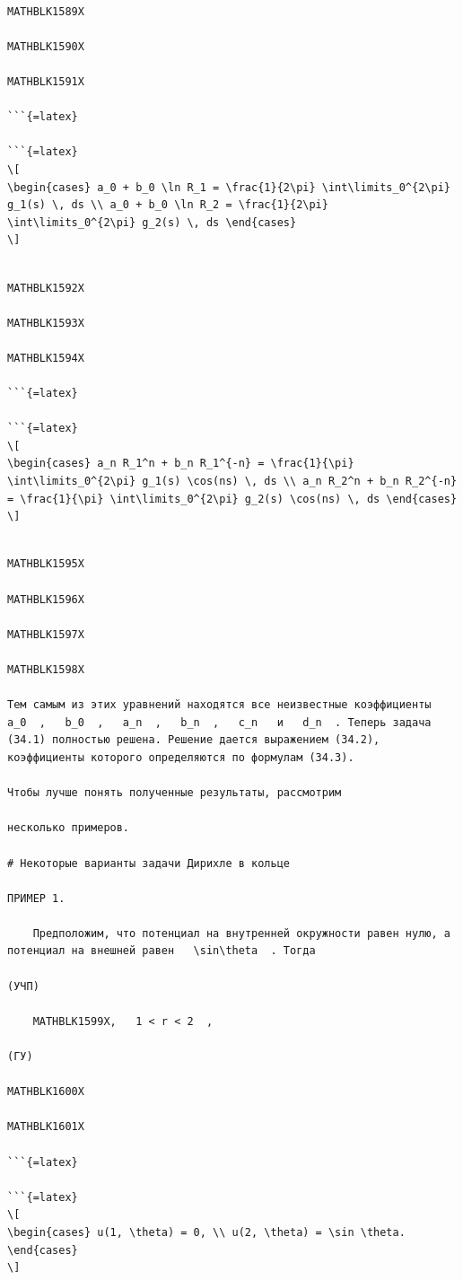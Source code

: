 \documentclass[
]{article}
\begin{document}
\begin{verbatim}

MATHBLK1589X

MATHBLK1590X

MATHBLK1591X

```{=latex}

```{=latex}
\[
\begin{cases} a_0 + b_0 \ln R_1 = \frac{1}{2\pi} \int\limits_0^{2\pi} g_1(s) \, ds \\ a_0 + b_0 \ln R_2 = \frac{1}{2\pi} \int\limits_0^{2\pi} g_2(s) \, ds \end{cases}
\]
\end{verbatim}

\begin{verbatim}

MATHBLK1592X

MATHBLK1593X

MATHBLK1594X

```{=latex}

```{=latex}
\[
\begin{cases} a_n R_1^n + b_n R_1^{-n} = \frac{1}{\pi} \int\limits_0^{2\pi} g_1(s) \cos(ns) \, ds \\ a_n R_2^n + b_n R_2^{-n} = \frac{1}{\pi} \int\limits_0^{2\pi} g_2(s) \cos(ns) \, ds \end{cases}
\]
\end{verbatim}

\begin{verbatim}

MATHBLK1595X

MATHBLK1596X

MATHBLK1597X

MATHBLK1598X

Тем самым из этих уравнений находятся все неизвестные коэффициенты   a_0  ,   b_0  ,   a_n  ,   b_n  ,   c_n   и   d_n  . Теперь задача (34.1) полностью решена. Решение дается выражением (34.2), коэффициенты которого определяются по формулам (34.3).

Чтобы лучше понять полученные результаты, рассмотрим

несколько примеров.

# Некоторые варианты задачи Дирихле в кольце

ПРИМЕР 1.

    Предположим, что потенциал на внутренней окружности равен нулю, а потенциал на внешней равен   \sin\theta  . Тогда

(УЧП)

    MATHBLK1599X,   1 < r < 2  ,

(ГУ)

MATHBLK1600X

MATHBLK1601X

```{=latex}

```{=latex}
\[
\begin{cases} u(1, \theta) = 0, \\ u(2, \theta) = \sin \theta. \end{cases}
\]
\end{verbatim}
\end{document}
